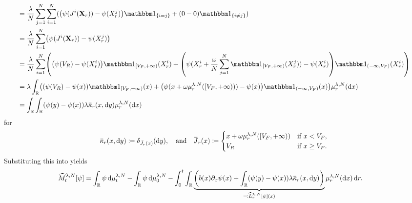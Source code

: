 \documentclass{article}
\begin{document}
\begin{equation}
\begin{split}
    &= \frac{\lambda}{N} \sum_{j=1}^N \sum_{i=1}^N \br{ \br*{ \psi(\jtarg^i(\bm{X}_r)) - \psi(X_{r}^j) } \ind{i = j} + (0 - 0) \ind{i \neq j} } \\
    &= \frac{\lambda}{N} \sum_{i=1}^N \br*{ \psi(\jtarg^i(\bm{X}_r)) - \psi(X_{r}^j) } \\
    &= \frac{\lambda}{N} \sum_{i=1}^N \br*{ \br*{ \psi(V_R) - \psi(X_{r}^i) } \indE{[V_F,+\infty)}(X_{r}^i)
    + \br*{ \psi(X_{r}^i + \frac{\omega}{N} \sum_{j=1}^N \indE{[V_F,+\infty)}(X_{r}^j)) - \psi(X_{r}^i) } \indE{(-\infty,V_F)}(X_{r}^i) } \\
    &= \lambda \int_\potspace \br*{ \br*{ \psi(V_R) - \psi(x) } \indE{[V_F,+\infty)}(x)
    + \br*{ \psi(x + \omega \mu_r^{\lambda, N}([V_F,+\infty))) - \psi(x) } \indE{(-\infty,V_F)}(x) } \mu_{r}^{\lambda, N}(\odif{x}) \\
    &= \int_\potspace \int_\potspace (\psi(y) - \psi(x)) \lambda \ol{\kappa}_r(x, \odif{y}) \mu_{r}^{\lambda, N}(\odif{x})
\end{split}
\end{equation}
for
\begin{equation}
    \ol{\kappa}_r(x, \odif{y}) \coloneqq \delta_{\bar{\jtarg}_r(x)}(\odif{y}),
    \quad\text{and}\quad
    \ol{\jtarg}_r(x) \coloneqq \begin{cases}
        x + \omega \mu_r^{\lambda, N}([V_F,+\infty)) &\text{if } x < V_F, \\
        V_R &\text{if } x \geq V_F.
    \end{cases}
\end{equation}
Substituting this into  yields
\begin{equation}
\begin{split}
    \widehat{M}_t^{\lambda, N}[\psi]
    &= \int_\potspace \psi \odif{\mu_t^{\lambda, N}} - \int_\potspace \psi \odif{\mu_0^{\lambda, N}}
    - \int_0^t \int_\potspace \underbrace{\br*{ b(x) \partial_x \psi(x) + \int_\potspace (\psi(y) - \psi(x)) \lambda \ol{\kappa}_r(x, \odif{y}) }}_{\eqqcolon \widehat{L}_r^{\lambda, N} [\psi](x)} \mu_{r}^{\lambda, N}(\odif{x}) \odif{r}.
\end{split}
\end{equation}
\end{document}
